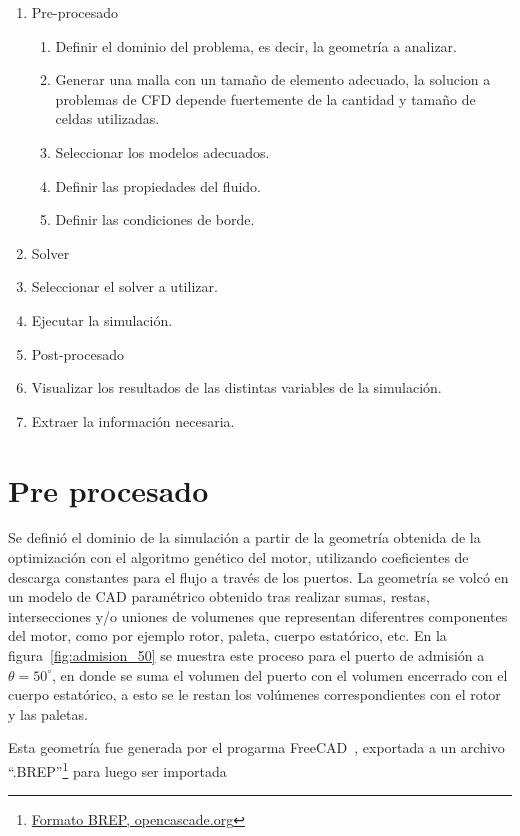 \begin{enumerate}
  \item Pre-procesado
        \begin{enumerate}
          \item Definir el dominio del problema, es decir, la geometría a analizar.
          \item Generar una malla con un tamaño de elemento adecuado, la solucion a problemas de CFD depende fuertemente de la cantidad y tamaño de celdas utilizadas.
          \item Seleccionar los modelos adecuados.
          \item Definir las propiedades del fluido.
          \item Definir las condiciones de borde.
        \end{enumerate}
  \item Solver
        \item Seleccionar el solver a utilizar.
        \item Ejecutar la simulación.
  \item Post-procesado
        \item Visualizar los resultados de las distintas variables de la simulación.
        \item Extraer la información necesaria.
\end{enumerate}

\section{Pre procesado}
%
Se definió el dominio de la simulación a partir de la geometría obtenida de la
optimización con el algoritmo genético del motor, utilizando coeficientes de
descarga constantes para el flujo a través de los puertos.
%
La geometría se volcó en un modelo de CAD paramétrico obtenido tras realizar
sumas, restas, intersecciones y/o uniones de volumenes que representan
diferentres componentes del motor, como por ejemplo rotor, paleta, cuerpo
estatórico, etc.
%
En la figura~\ref{fig:admision_50} se muestra este proceso para el puerto de
admisión a $\theta=50^{\circ}$, en donde se suma el volumen del puerto con el
volumen encerrado con el cuerpo estatórico, a esto se le restan los volúmenes
correspondientes con el rotor y las paletas.

Esta geometría fue generada por el progarma FreeCAD~\cite{freecad}, exportada a
un archivo
``.BREP''\footnote{\href{https://dev.opencascade.org/doc/overview/html/specification\_\_brep\_format.html}{Formato BREP, opencascade.org}}
para luego ser importada

